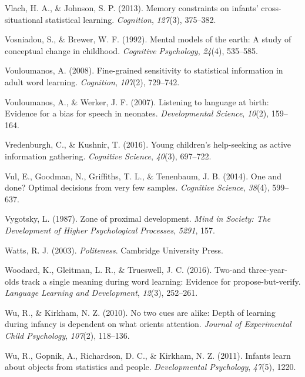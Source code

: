 \documentclass[oneside]{report}
\begin{document}
\hypertarget{ref-vlach2013memory}{}
Vlach, H. A., \& Johnson, S. P. (2013). Memory constraints on infants'
cross-situational statistical learning. \emph{Cognition}, \emph{127}(3),
375--382.

\hypertarget{ref-vosniadou1992mental}{}
Vosniadou, S., \& Brewer, W. F. (1992). Mental models of the earth: A
study of conceptual change in childhood. \emph{Cognitive Psychology},
\emph{24}(4), 535--585.

\hypertarget{ref-vouloumanos2008fine}{}
Vouloumanos, A. (2008). Fine-grained sensitivity to statistical
information in adult word learning. \emph{Cognition}, \emph{107}(2),
729--742.

\hypertarget{ref-vouloumanos2007listening}{}
Vouloumanos, A., \& Werker, J. F. (2007). Listening to language at
birth: Evidence for a bias for speech in neonates. \emph{Developmental
Science}, \emph{10}(2), 159--164.

\hypertarget{ref-vredenburgh2016young}{}
Vredenburgh, C., \& Kushnir, T. (2016). Young children's help-seeking as
active information gathering. \emph{Cognitive Science}, \emph{40}(3),
697--722.

\hypertarget{ref-vul2014}{}
Vul, E., Goodman, N., Griffiths, T. L., \& Tenenbaum, J. B. (2014). One
and done? Optimal decisions from very few samples. \emph{Cognitive
Science}, \emph{38}(4), 599--637.

\hypertarget{ref-vygotsky1987zone}{}
Vygotsky, L. (1987). Zone of proximal development. \emph{Mind in
Society: The Development of Higher Psychological Processes},
\emph{5291}, 157.

\hypertarget{ref-watts2003}{}
Watts, R. J. (2003). \emph{Politeness}. Cambridge University Press.

\hypertarget{ref-woodard2016two}{}
Woodard, K., Gleitman, L. R., \& Trueswell, J. C. (2016). Two-and
three-year-olds track a single meaning during word learning: Evidence
for propose-but-verify. \emph{Language Learning and Development},
\emph{12}(3), 252--261.

\hypertarget{ref-wu2010no}{}
Wu, R., \& Kirkham, N. Z. (2010). No two cues are alike: Depth of
learning during infancy is dependent on what orients attention.
\emph{Journal of Experimental Child Psychology}, \emph{107}(2),
118--136.

\hypertarget{ref-wu2011infants}{}
Wu, R., Gopnik, A., Richardson, D. C., \& Kirkham, N. Z. (2011). Infants
learn about objects from statistics and people. \emph{Developmental
Psychology}, \emph{47}(5), 1220.
\end{document}
